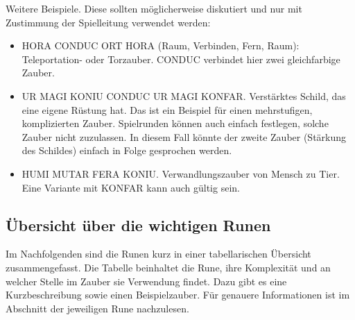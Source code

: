 \documentclass{article}
\begin{document}
Weitere Beispiele. Diese sollten möglicherweise diskutiert und nur mit Zustimmung der Spielleitung verwendet werden:

\begin{itemize}
\item HORA CONDUC ORT HORA (Raum, Verbinden, Fern, Raum): Teleportation- oder Torzauber. CONDUC verbindet hier zwei gleichfarbige Zauber.
\item UR MAGI KONIU CONDUC UR MAGI KONFAR. Verstärktes Schild, das eine eigene Rüstung hat. Das ist ein Beispiel für einen mehrstufigen, komplizierten Zauber. Spielrunden können auch einfach festlegen, solche Zauber nicht zuzulassen. In diesem Fall könnte der zweite Zauber (Stärkung des Schildes) einfach in Folge gesprochen werden.
\item HUMI MUTAR FERA KONIU. Verwandlungszauber von Mensch zu Tier. Eine Variante mit KONFAR kann auch gültig sein.
\end{itemize}

\begin{center}
\subsection{Übersicht über die wichtigen Runen}
\end{center}

Im Nachfolgenden sind die Runen kurz in einer tabellarischen Übersicht zusammengefasst. Die Tabelle beinhaltet
die Rune, ihre Komplexität und an welcher Stelle im Zauber sie Verwendung findet. Dazu gibt es eine Kurzbeschreibung
sowie einen Beispielzauber. Für genauere Informationen ist im Abschnitt der jeweiligen Rune nachzulesen.
\end{document}
